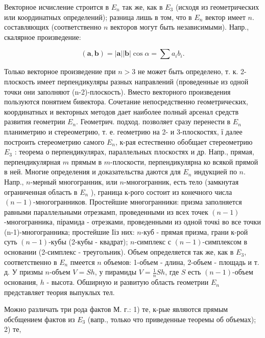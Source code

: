 \documentclass[10pt]{article}
\begin{document}
Векторное исчисление строится в $E_{n}$ так же, как в $E_{3}$ (исходя из геометрических или координатных определений); разница лишь в том, что в $E_{n}$ вектор имеет $n$. составляющих (соответственно $n$ векторов могут быть независимыми). Напр., скалярное произведение:



\[

(\boldsymbol{a}, \boldsymbol{b})=|\boldsymbol{a}||\boldsymbol{b}| \cos \alpha=\sum a_{i} b_{i} .

\]



Только векторное произведение при $n>3$ не может быть определено, т. к. 2-плоскость имеет перпендикуляры разных направлений (проведенные из одной точки они заполняют (n-2)-плоскость). Вместо векторного произведения пользуются понятием бивектора. Сочетание непосредственно геометрических, координатных и векторных методов дает наиболее полный арсенал средств развития геометрии $E_{n}$. Геометрич. подход. позволяет сразу перенести в $E_{n}$ планиметрию и стереометрию, т. е. геометрию на 2- и 3-плоскостях, ї далее построить стереометрию самого $E_{n}$, к-рая естественно обобщает стереометрию $E_{3}$ : теорема о перпендикулярах, параллельных плоскостях и др. Напр., прямая, перпендикулярная $m$ прямым в $m$-плоскости, перпендикулярна ко всякой прямой в ней. Многие определения и доказательства даются для $E_{n}$ индукцией по $n$. Напр., $n$-мерный многогранник, или $n$-многогранник, есть тело (замкнутая ограниченная область в $E_{n}$ ), граница к-рого состоит из конечного числа $(n-1)$-многогранников. Простейшие мнөгогранники: призма заполняется равными параллельными отрезкамп, проведенными из всех точек $(n-1)$-многогранника, пірамида - отрезками, проведенными из одной точкі во все точки (n-1)-многогранника; простейшие Iіз них: $n$-куб - прямая призма, грани к-рой суть $(n-1)$-кубы (2-кубы - квадрат); $n$-симплекс с $(n-1)$-симплексом в основании (2-симплекс - треугольник). Объем определяется так же, как в $E_{3}$, соответственно в $E_{n}$ пмеется $n$ объемов: 1-объем - длина, 2-объем - площадь и т. д. У призмы $n$-объем $V=S h$, у пирамиды $V=\frac{1}{n} S h$, где $S$ есть $(n-1)$-объем основания, $h$ - высота. Обширную и развитую область геометрии $E_{n}$ представляет теория выпуклых тел.



Можно различать три рода фактов М. г.: 1) те, к-рые являются прямым обсбщением фактов из $E_{3}$ (вапр., только что приведенные теоремы об объемах); 2) те,
\end{document}
